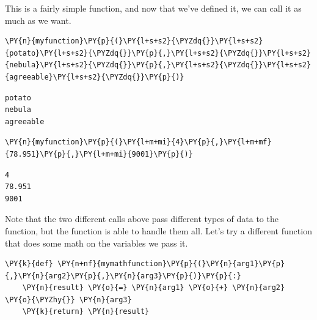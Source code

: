     This is a fairly simple function, and now that we've defined it, we can
call it as much as we want.

    \begin{tcolorbox}[breakable, size=fbox, boxrule=1pt, pad at break*=1mm,colback=cellbackground, colframe=cellborder]
\begin{Verbatim}[commandchars=\\\{\}]
\PY{n}{myfunction}\PY{p}{(}\PY{l+s+s2}{\PYZdq{}}\PY{l+s+s2}{potato}\PY{l+s+s2}{\PYZdq{}}\PY{p}{,}\PY{l+s+s2}{\PYZdq{}}\PY{l+s+s2}{nebula}\PY{l+s+s2}{\PYZdq{}}\PY{p}{,}\PY{l+s+s2}{\PYZdq{}}\PY{l+s+s2}{agreeable}\PY{l+s+s2}{\PYZdq{}}\PY{p}{)}
\end{Verbatim}
\end{tcolorbox}

    \begin{Verbatim}[commandchars=\\\{\}]
potato
nebula
agreeable
    \end{Verbatim}

    \begin{tcolorbox}[breakable, size=fbox, boxrule=1pt, pad at break*=1mm,colback=cellbackground, colframe=cellborder]
\begin{Verbatim}[commandchars=\\\{\}]
\PY{n}{myfunction}\PY{p}{(}\PY{l+m+mi}{4}\PY{p}{,}\PY{l+m+mf}{78.951}\PY{p}{,}\PY{l+m+mi}{9001}\PY{p}{)}
\end{Verbatim}
\end{tcolorbox}

    \begin{Verbatim}[commandchars=\\\{\}]
4
78.951
9001
    \end{Verbatim}

    Note that the two different calls above pass different types of data to
the function, but the function is able to handle them all. Let's try a
different function that does some math on the variables we pass it.

    \begin{tcolorbox}[breakable, size=fbox, boxrule=1pt, pad at break*=1mm,colback=cellbackground, colframe=cellborder]
\begin{Verbatim}[commandchars=\\\{\}]
\PY{k}{def} \PY{n+nf}{mymathfunction}\PY{p}{(}\PY{n}{arg1}\PY{p}{,}\PY{n}{arg2}\PY{p}{,}\PY{n}{arg3}\PY{p}{)}\PY{p}{:}
    \PY{n}{result} \PY{o}{=} \PY{n}{arg1} \PY{o}{+} \PY{n}{arg2} \PY{o}{\PYZhy{}} \PY{n}{arg3}
    \PY{k}{return} \PY{n}{result}
\end{Verbatim}
\end{tcolorbox}

